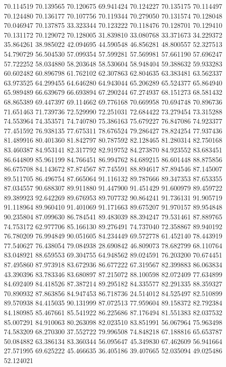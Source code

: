 70.114519
70.139565
70.120675
69.941424
70.124227
70.135175
70.114497
70.124480
70.136177
70.107756
70.119344
70.279050
70.131574
70.128048
70.046947
70.137875
33.323344
70.123222
70.118476
70.128701
70.129410
70.131172
70.129072
70.128005
31.839810
33.080768
33.371673
34.229372
35.864261
38.985022
42.094695
44.590548
46.856281
48.800557
52.327513
54.790729
56.504530
57.099354
57.599281
57.569981
57.661190
57.696247
57.722252
58.034880
58.203648
58.530604
58.948404
59.388632
59.933283
60.602482
60.896798
61.762102
62.307863
62.804635
63.383481
63.562337
63.973525
64.299455
64.646280
64.943044
65.206289
65.524377
65.864940
65.989489
66.639679
66.693894
67.290244
67.274937
68.151273
68.581432
68.865389
69.447397
69.114662
69.776168
70.669958
70.694748
70.896736
71.651463
71.739736
72.529990
72.251031
72.684422
73.279454
73.315288
74.553964
74.353571
74.740780
75.386163
75.679227
76.847086
74.923377
77.451592
76.938135
77.675311
78.676524
79.286427
78.824254
77.937436
81.489916
80.401360
81.842797
80.787592
82.128465
81.280314
82.750168
83.460387
84.953141
82.317792
82.919752
84.273870
84.923552
83.683451
86.644809
85.961199
84.766451
86.994762
84.689215
86.601448
88.875856
86.675708
84.143672
87.874567
87.745591
88.894617
87.894546
87.145007
89.511705
86.496754
87.665064
91.116132
89.787666
89.347353
87.653355
87.034557
90.688307
89.911880
91.447900
91.451429
91.600979
89.459722
89.389923
92.642269
89.676953
89.707732
90.864241
91.736131
91.905719
91.118964
89.960410
91.401069
91.171663
89.675207
91.970157
89.954848
90.235804
87.099630
86.784541
89.483039
88.394247
79.531461
87.889765
74.753172
62.977706
85.166130
89.276491
74.737040
72.358867
89.940192
76.780209
76.994849
90.051605
84.234449
69.572778
61.452140
78.443919
77.540627
76.438054
79.084938
28.690842
46.809073
78.682799
68.110764
83.048921
88.659553
69.304755
64.948562
89.024591
76.203200
70.674451
87.495860
87.973918
83.672936
86.677222
67.319567
82.399883
86.063834
43.390396
83.783346
83.680897
87.215072
88.100598
82.072409
77.634899
84.692409
84.418526
87.387214
89.295182
84.335577
82.291335
88.359327
70.890932
87.863856
84.947453
86.718736
24.514012
84.525497
82.510899
89.570938
84.415035
90.131999
87.072513
77.959604
89.158372
82.792384
84.180985
85.467661
85.541922
86.225686
87.176494
81.551383
82.037532
85.007291
84.910063
80.263098
82.023510
83.851991
56.067964
75.963498
74.583209
68.270300
37.552722
79.996508
74.848218
67.188816
65.653787
50.084882
63.386134
83.360344
56.095647
45.349830
67.462609
56.941664
27.571995
69.625222
45.466635
36.405186
39.407665
52.035094
49.025486
52.124021
